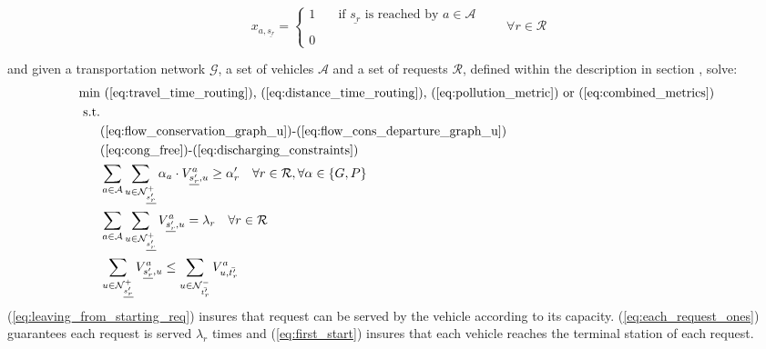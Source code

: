 \begin{equation*}
	x_{a,\underline{s_r} }= 
	\begin{cases} 
		1 & \quad \text{if $\underline{s_r} $ is reached by }  a \in \mathcal{A}\\
		\\
		0
	\end{cases}
	\quad\quad \forall r \in \mathcal{R}
	\label{eq:var_dispatching}
\end{equation*}

 and given a transportation network $\mathcal{G}$, a set of vehicles $\mathcal{A}$ and a set of requests $\mathcal{R}$, defined within the description in section , solve:\\
\begin{align}
	\text{min}&  \text{
		(\ref{eq:travel_time_routing}), (\ref{eq:distance_time_routing}), (\ref{eq:pollution_metric}) or (\ref{eq:combined_metrics})
	}\nonumber\\
	\text{s.t.} &\nonumber\\
	&\text{(\ref{eq:flow_conservation_graph_u})-(\ref{eq:flow_cons_departure_graph_u})}\nonumber\\
	&\text{(\ref{eq:cong_free})-(\ref{eq:discharging_constraints})}\nonumber\\
	&\sum_{ a \in \mathcal{A} }
	\sum_{u \in \mathcal{N}^+_{\underline{s'_r}} } \alpha_a \cdot V^a_{ \underline{s'_r}, u} \ge \alpha'_r \quad \forall r \in \mathcal{R}, \forall \alpha \in \{G, P\}	\label{eq:leaving_from_starting_req}\\
	&\sum_{ a \in \mathcal{A} }\sum_{u \in \mathcal{N}^+_{\underline{s'_r}} } V^a_{ \underline{s'_r}, u} =\lambda_r\quad \forall r \in \mathcal{R}	\label{eq:each_request_ones}\\
	&\sum_{u \in \mathcal{N}^+_{\underline{s'_r}} }  V^a_{ \underline{s'_r}, u} \leq \sum_{u \in \mathcal{N}^-_{\bar{t'_r}} }  V^a_{u,\bar{t'_r}} \label{eq:first_start}
\end{align}
(\ref{eq:leaving_from_starting_req}) insures that request can be served by the vehicle according to its capacity. (\ref{eq:each_request_ones}) guarantees each request is served $\lambda_r$ times and (\ref{eq:first_start}) insures that each vehicle reaches the terminal station of each request. 
